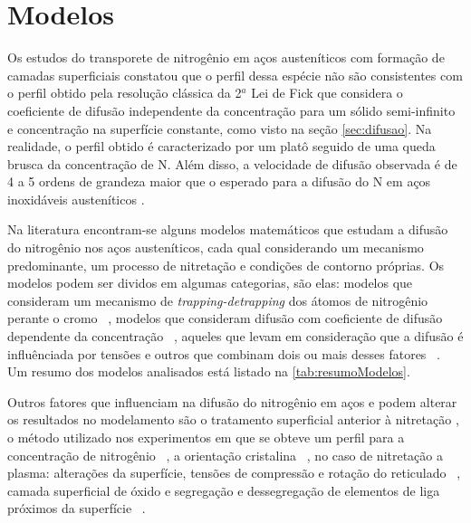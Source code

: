 \documentclass[]{politex}
\begin{document}
\section{Modelos}
	Os estudos do transporete de nitrogênio em aços austeníticos com formação de camadas superficiais constatou que o perfil dessa espécie não são consistentes com o perfil obtido pela resolução clássica da 2$^a$ Lei de Fick que considera o coeficiente de difusão independente da concentração para um sólido semi-infinito e concentração na superfície constante, como visto na seção \autoref{sec:difusao}. Na realidade, o perfil obtido é caracterizado por um platô seguido de uma queda brusca da concentração de N. Além disso, a velocidade de difusão observada é de 4 a 5 ordens de grandeza maior que o esperado para a difusão do N em aços inoxidáveis austeníticos \cite{parascandola2000nitrogen}. \par
	Na literatura encontram-se alguns modelos matemáticos que estudam a difusão do nitrogênio nos aços austeníticos, cada qual considerando um mecanismo predominante, um processo de nitretação e condições de contorno próprias. Os modelos podem ser dividos em algumas categorias, são elas: modelos que consideram um mecanismo de \textit{trapping-detrapping} dos átomos de nitrogênio perante o cromo ~\cite{parascandola2000nitrogen, moller2001surface, moskalioviene2011modeling}, modelos que consideram difusão com coeficiente de difusão dependente da concentração ~\cite{mandl2002concentration, mandl2003nitrogen}, aqueles que levam em consideração que a difusão é influênciada por tensões \cite{galdikas2010stress} e outros que combinam dois ou mais desses fatores ~\cite{christiansen2008nitrogen, moskalioviene2012stress}. Um resumo dos modelos analisados está listado na \autoref{tab:resumoModelos}.\par
	Outros fatores que influenciam na difusão do nitrogênio em aços e podem alterar os resultados no modelamento são o tratamento superficial anterior à nitretação \cite{baranowska2010importance}, o método utilizado nos experimentos em que se obteve um perfil para a concentração de nitrogênio ~\cite{moskalioviene2011modeling}, a orientação cristalina ~\cite{moskalioviene2011modeling}, no caso de nitretação a plasma:  alterações da superfície, tensões de compressão e rotação do reticulado  ~\cite{moskalioviene2011modeling}, camada superficial de óxido e segregação e dessegregação de elementos de liga próximos da superfície ~\cite{mandl2002concentration}.
	
\end{document}
